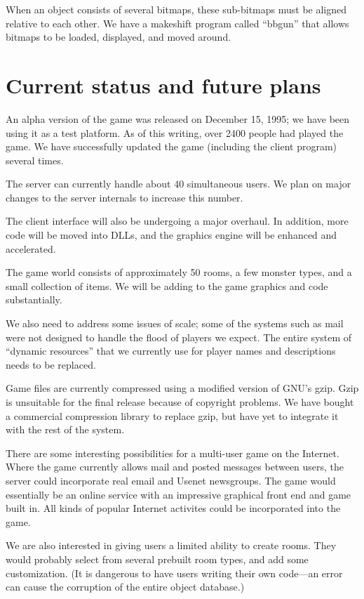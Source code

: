 \documentclass[12pt]{article}
\begin{document}
When an object consists of several bitmaps, these sub-bitmaps must be
aligned relative to each other.  We have a makeshift program called
``bbgun'' that allows bitmaps to be loaded, displayed, and moved
around.


\section{Current status and future plans}

An alpha version of the game was released on December 15, 1995; we
have been using it as a test platform.  As of this writing, over 2400
people had played the game.  We have successfully updated the game
(including the client program) several times.

The server can currently handle about 40 simultaneous users.  We plan
on major changes to the server internals to increase this number.

The client interface will also be undergoing a major overhaul.  In
addition, more code will be moved into DLLs, and the graphics engine
will be enhanced and accelerated.

The game world consists of approximately 50 rooms, a few monster
types, and a small collection of items.  We will be adding to the game
graphics and code substantially.

We also need to address some issues of scale; some of the systems such
as mail were not designed to handle the flood of players we expect.
The entire system of ``dynamic resources'' that we currently use for
player names and descriptions needs to be replaced.

Game files are currently compressed using a modified version of GNU's
gzip.  Gzip is unsuitable for the final release because of copyright
problems.  We have bought a commercial compression library to replace
gzip, but have yet to integrate it with the rest of the system.

There are some interesting possibilities for a multi-user game on the
Internet.  Where the game currently allows mail and posted messages
between users, the server could incorporate real email and Usenet
newsgroups.  The game would essentially be an online service with an
impressive graphical front end and game built in.  All kinds of
popular Internet activites could be incorporated into the game.

We are also interested in giving users a limited ability to create
rooms.  They would probably select from several prebuilt room types,
and add some customization.  (It is dangerous to have users writing
their own code---an error can cause the corruption of the entire
object database.)
\end{document}
